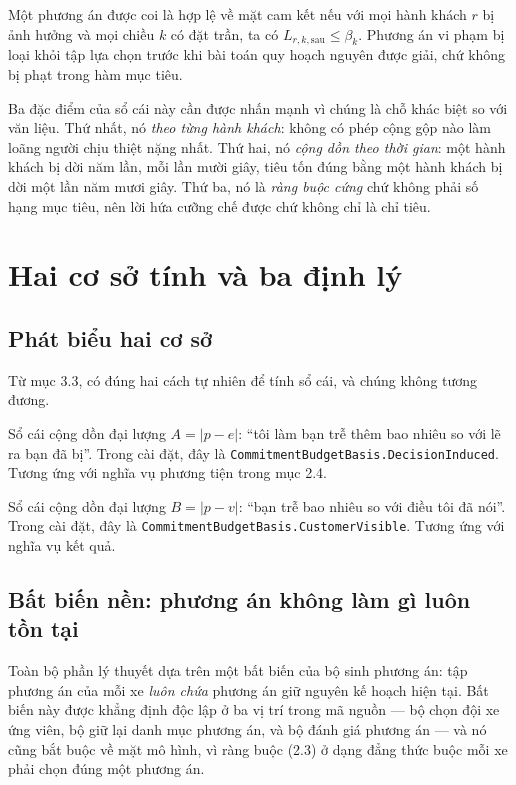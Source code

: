 Một phương án được coi là hợp lệ về mặt cam kết nếu với mọi hành khách $r$ bị ảnh hưởng và mọi
chiều $k$ có đặt trần, ta có $L_{r,k,\text{sau}} \le \beta_k$. Phương án vi phạm bị loại khỏi
tập lựa chọn trước khi bài toán quy hoạch nguyên được giải, chứ không bị phạt trong hàm mục
tiêu.

Ba đặc điểm của sổ cái này cần được nhấn mạnh vì chúng là chỗ khác biệt so với văn liệu. Thứ
nhất, nó \emph{theo từng hành khách}: không có phép cộng gộp nào làm loãng người chịu thiệt
nặng nhất. Thứ hai, nó \emph{cộng dồn theo thời gian}: một hành khách bị dời năm lần, mỗi lần
mười giây, tiêu tốn đúng bằng một hành khách bị dời một lần năm mươi giây. Thứ ba, nó là
\emph{ràng buộc cứng} chứ không phải số hạng mục tiêu, nên lời hứa cưỡng chế được chứ không
chỉ là chỉ tiêu.

\section{Hai cơ sở tính và ba định lý}

\subsection{Phát biểu hai cơ sở}

Từ mục 3.3, có đúng hai cách tự nhiên để tính sổ cái, và chúng không tương đương.

\begin{dinhnghia}[Cơ sở hành vi]
Sổ cái cộng dồn đại lượng $A = |p-e|$: ``tôi làm bạn trễ thêm bao nhiêu so với lẽ ra bạn đã bị''.
Trong cài đặt, đây là \texttt{CommitmentBudgetBasis.DecisionInduced}. Tương ứng với nghĩa vụ
phương tiện trong mục 2.4.
\end{dinhnghia}

\begin{dinhnghia}
Sổ cái cộng dồn đại lượng $B = |p-v|$: ``bạn trễ bao nhiêu so với điều tôi đã nói''. Trong cài
đặt, đây là \texttt{CommitmentBudgetBasis.CustomerVisible}. Tương ứng với nghĩa vụ kết quả.
\end{dinhnghia}

\subsection{Bất biến nền: phương án không làm gì luôn tồn tại}

Toàn bộ phần lý thuyết dựa trên một bất biến của bộ sinh phương án: tập phương án của mỗi xe
\emph{luôn chứa} phương án giữ nguyên kế hoạch hiện tại. Bất biến này được khẳng định độc lập ở
ba vị trí trong mã nguồn --- bộ chọn đội xe ứng viên, bộ giữ lại danh mục phương án, và bộ đánh
giá phương án --- và nó cũng bắt buộc về mặt mô hình, vì ràng buộc (2.3) ở dạng đẳng thức buộc
mỗi xe phải chọn đúng một phương án.


